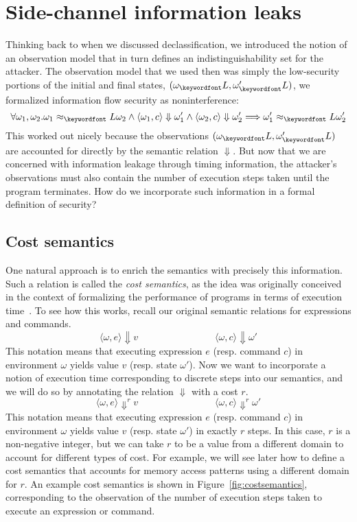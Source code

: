\documentclass[11pt,twoside]{scrartcl}
\begin{document}
\section{Side-channel information leaks}

Thinking back to when we discussed declassification, we introduced the notion of an observation model that in turn defines an indistinguishability set for the attacker. The observation model that we used then was simply the low-security portions of the initial and final states, $(\omega_\lowt, \omega'_\lowt)$, we formalized information flow security as noninterference:
\begin{equation}
\label{eq:nonint}
\forall \omega_1,\omega_2 . \omega_1 \approx_\lowt \omega_2 \land \langle \omega_1, c\rangle \Downarrow \omega_1' \land \langle\omega_2, c\rangle\Downarrow\omega_2' \Longrightarrow \omega_1' \approx_\lowt \omega_2'
\end{equation}
This worked out nicely because the observations $(\omega_\lowt, \omega'_\lowt)$ are accounted for directly by the semantic relation $\Downarrow$. But now that we are concerned with information leakage through timing information, the attacker's observations must also contain the number of execution steps taken until the program terminates. How do we incorporate such information in a formal definition of security?

\subsection{Cost semantics}
One natural approach is to enrich the semantics with precisely this information. Such a relation is called the \emph{cost semantics}, as the idea was originally conceived in the context of formalizing the performance of programs in terms of execution time~\cite{Hoffmann11}. To see how this works, recall our original semantic relations for expressions and commands.
\[
\langle \omega, e\rangle \Downarrow v
\quad\quad\quad\quad\quad\quad\quad\quad
\langle \omega, c\rangle \Downarrow \omega'
\]
This notation means that executing expression $e$ (resp. command $c$) in environment $\omega$ yields value $v$ (resp. state $\omega'$). Now we want to incorporate a notion of execution time corresponding to discrete steps into our semantics, and we will do so by annotating the relation $\Downarrow$ with a cost $r$.
\[
\langle \omega, e\rangle \Downarrow^r v
\quad\quad\quad\quad\quad\quad\quad\quad
\langle \omega, c\rangle \Downarrow^r \omega'
\]
This notation means that executing expression $e$ (resp. command $c$) in environment $\omega$ yields value $v$ (resp. state $\omega'$) in exactly $r$ steps. In this case, $r$ is a non-negative integer, but we can take $r$ to be a value from a different domain to account for different types of cost. For example, we will see later how to define a cost semantics that accounts for memory access patterns using a different domain for $r$.
An example cost semantics is shown in Figure~\ref{fig:costsemantics}, corresponding to the observation of the number of execution steps taken to execute an expression or command. 
\end{document}
